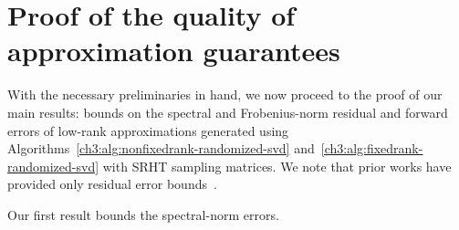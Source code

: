 % 
\section{Proof of the quality of approximation guarantees} 
\label{ch3:sec:guarantees}

With the necessary preliminaries in hand, we now proceed to the proof of 
our main results: bounds on the spectral and Frobenius-norm residual and 
forward errors of low-rank approximations generated using 
Algorithms~\ref{ch3:alg:nonfixedrank-randomized-svd} 
and~\ref{ch3:alg:fixedrank-randomized-svd} with SRHT sampling matrices.
We note that prior works have provided only residual error bounds~\cite{WLRT08,HMT11,NDT09}.

Our first result bounds the spectral-norm errors.

